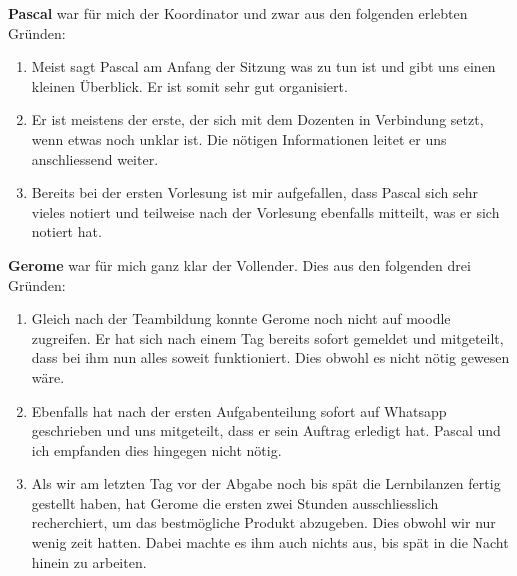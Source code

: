 \textbf{Pascal} war für mich der Koordinator und zwar aus den folgenden erlebten Gründen:
\begin{enumerate} 
\item{Meist sagt Pascal am Anfang der Sitzung was zu tun ist und gibt uns einen kleinen Überblick. Er ist somit sehr gut organisiert.}
\item{Er ist meistens der erste, der sich mit dem Dozenten in Verbindung setzt, wenn etwas noch unklar ist. Die nötigen Informationen leitet er uns anschliessend weiter.}
\item{Bereits bei der ersten Vorlesung ist mir aufgefallen, dass Pascal sich sehr vieles notiert und teilweise nach der Vorlesung ebenfalls mitteilt, was er sich notiert hat.}
\end{enumerate}

\textbf{Gerome} war für mich ganz klar der Vollender. Dies aus den folgenden drei Gründen:
\begin{enumerate} 
\item{Gleich nach der Teambildung konnte Gerome noch nicht auf moodle zugreifen. Er hat sich nach einem Tag bereits sofort gemeldet und mitgeteilt, dass bei ihm nun alles soweit funktioniert. Dies obwohl es nicht nötig gewesen wäre.}
\item{Ebenfalls hat nach der ersten Aufgabenteilung sofort auf Whatsapp geschrieben und uns mitgeteilt, dass er sein Auftrag erledigt hat. Pascal und ich empfanden dies hingegen nicht nötig.}
\item{Als wir am letzten Tag vor der Abgabe noch bis spät die Lernbilanzen fertig gestellt haben, hat Gerome die ersten zwei Stunden ausschliesslich recherchiert, um das bestmögliche Produkt abzugeben. Dies obwohl wir nur wenig zeit hatten. Dabei machte es ihm auch nichts aus, bis spät in die Nacht hinein zu arbeiten.}
\end{enumerate}

